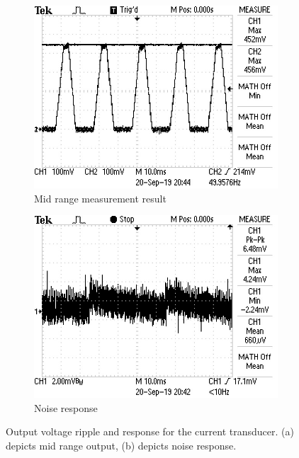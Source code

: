 \begin{figure}[h]
 \centering
     \begin{subfigure}[]{0.45\textwidth}
        \centering
         \includegraphics[width=1\linewidth]{./Figures/currenttransducermidrange.JPG}
		    \caption{Mid range measurement result} \label{subfig:currenttransducermidrange}
     \end{subfigure}
      \begin{subfigure}[]{0.45\textwidth}
              \centering
  		\includegraphics[width=1\linewidth]{./Figures/currenttransducernoise.JPG}
		    \caption{Noise response} \label{subfig:currenttransducermidrangenoise}
     \end{subfigure}
   \caption[Measured results for the current transducer]{Output voltage ripple and response for the current transducer. (a) depicts mid range output, (b) depicts noise response. }
    \label{fig:simulation_results_box}
 \end{figure}





